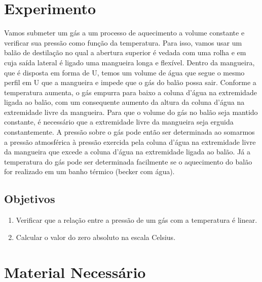 \section{Experimento}

Vamos submeter um gás a um processo de aquecimento a volume constante e verificar sua pressão como função da temperatura. Para isso, vamos usar um balão de destilação no qual a abertura superior é vedada com uma rolha e em cuja saída lateral é ligado uma mangueira longa e flexível. Dentro da mangueira, que é disposta em forma de U, temos um volume de água que segue o mesmo perfil em U que a mangueira e impede que o gás do balão possa sair. Conforme a temperatura aumenta, o gás empurra para baixo a coluna d'água na extremidade ligada ao balão, com um consequente aumento da altura da coluna d'água na extremidade livre da mangueira. Para que o volume do gás no balão seja mantido constante, é necessário que a extremidade livre da mangueira seja erguida constantemente. A pressão sobre o gás pode então ser determinada ao somarmos a pressão atmosférica à pressão exercida pela coluna d'água na extremidade livre da mangueira que excede a coluna d'água na extremidade ligada ao balão. Já a temperatura do gás pode ser determinada facilmente se o aquecimento do balão for realizado em um banho térmico (becker com água).

\subsection{Objetivos}
\label{Sec:ObjetivosZeroAbsoluto}

\begin{enumerate}
	\item Verificar que a relação entre a pressão de um gás com a temperatura é linear.
	\item Calcular o valor do zero absoluto na escala Celsius.
\end{enumerate}

\pagebreak
\section{Material Necessário}

